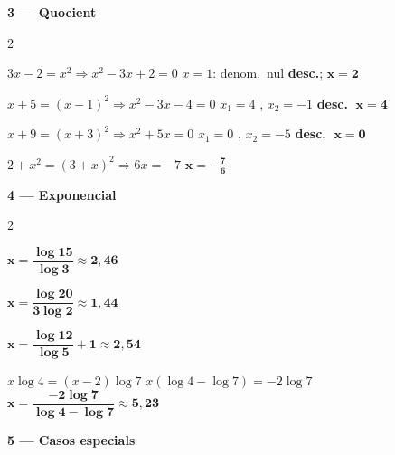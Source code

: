 \documentclass[12pt,a4paper]{article}
\begin{document}
\vspace{0.25cm}

\noindent\textbf{3 --- Quocient}

\begin{multicols}{2}
\begin{exercicis}
    \item $3x-2=x^2\Rightarrow x^2-3x+2=0$ \newline $x=1$: denom.\ nul \textbf{desc.}; $\boldsymbol{x=2}$ \checkmark
    \item $x+5=(x-1)^2\Rightarrow x^2-3x-4=0$ \newline $x_1=4$ \checkmark, $x_2=-1$ \textbf{desc.} $\;\boldsymbol{x=4}$
    \item $x+9=(x+3)^2\Rightarrow x^2+5x=0$ \newline $x_1=0$ \checkmark, $x_2=-5$ \textbf{desc.} $\;\boldsymbol{x=0}$
    \item $2+x^2=(3+x)^2\Rightarrow 6x=-7$ \newline $\boldsymbol{x=-\tfrac{7}{6}}$ \checkmark
\end{exercicis}
\end{multicols}

\vspace{0.25cm}

\noindent\textbf{4 --- Exponencial}

\begin{multicols}{2}
\begin{exercicis}
    \item $\boldsymbol{x=\dfrac{\log 15}{\log 3}\approx2{,}46}$
    \item $\boldsymbol{x=\dfrac{\log 20}{3\log 2}\approx1{,}44}$
    \item $\boldsymbol{x=\dfrac{\log 12}{\log 5}+1\approx2{,}54}$
    \item $x\log4=(x-2)\log7$ \newline $x(\log4-\log7)=-2\log7$ \newline $\boldsymbol{x=\dfrac{-2\log7}{\log4-\log7}\approx5{,}23}$
\end{exercicis}
\end{multicols}

\vspace{0.25cm}

\noindent\textbf{5 --- Casos especials}
\end{document}
